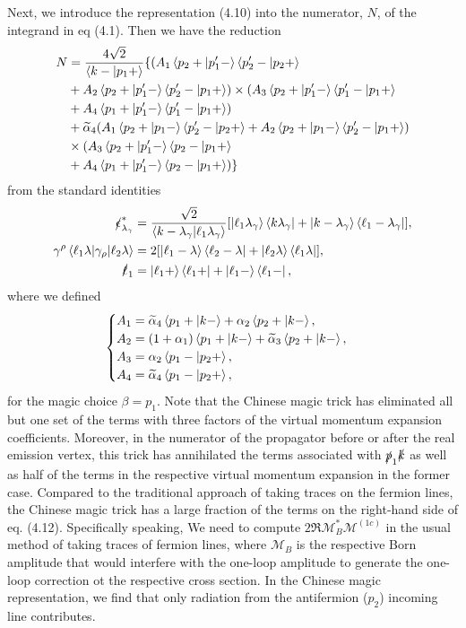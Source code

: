 Next, we introduce the representation (4.10) into the numerator, $N$, of the integrand in eq (4.1). Then we have the reduction
\begin{align}
N&=\frac{4\sqrt{2}}{\braket{k-|p_1+}}\{ (A_1\braket{p_2+|p'_1-}\braket{p'_2-|p_2+}\nonumber\\
& +A_2\braket{p_2+|p'_1-}\braket{p'_2-|p_1+} )\times(A_3\braket{p_2+|p'_1-}\braket{p'_1-|p_1+}\nonumber\\
& +A_4\braket{p_1+|p'_1-}\braket{p'_1-|p_1+} ) \nonumber\\
&+\widetilde{\alpha}_4 (A_1\braket{p_2+|p_1-}\braket{p'_2-|p_2+} +A_2\braket{p_2+|p_1-}\braket{p'_2-|p_1+} )
\nonumber\\
&\times(A_3\braket{p_2+|p'_1-}\braket{p_2-|p_1+}\nonumber\\
& +A_4\braket{p_1+|p'_1-}\braket{p_2-|p_1+} ) \}
\end{align}
from the standard identities
\begin{align}
\slashed \epsilon_{\lambda_\gamma}^\ast&=\frac{\sqrt{2}}{\braket{k-\lambda_\gamma|\ell_1\lambda_\gamma}}[\ket{\ell_1\lambda_\gamma}\bra{k\lambda_\gamma}+\ket{k-\lambda_\gamma}\bra{\ell_1-\lambda_\gamma}],\nonumber\\
\gamma^\rho\braket{\ell_1\lambda|\gamma_\rho|\ell_2\lambda}&=2[\ket{\ell_1-\lambda}\bra{\ell_2-\lambda}+\ket{\ell_2\lambda}\bra{\ell_1\lambda}],\nonumber\\
\slashed\ell_1&=\ket{\ell_1+}\bra{\ell_1+}+\ket{\ell_1-}\bra{\ell_1-},
\end{align}
where we defined
\begin{equation}
\begin{cases}
A_1=\widetilde{\alpha}_4\braket{p_1+|k-}+\alpha_2\braket{p_2+|k-},
\\
A_2=(1+\alpha_1)\braket{p_1+|k-}+\widetilde{\alpha}_3\braket{p_2+|k-},\\
A_3=\alpha_2\braket{p_1-|p_2+},\\
A_4=\widetilde{\alpha}_4\braket{p_1-|p_2+},
\end{cases}
\end{equation}
for the magic choice $\beta=p_1$. Note that the Chinese magic trick has eliminated all but one set of the terms with three factors of the virtual momentum expansion coefficients. Moreover, in the numerator of the propagator before or after the real emission vertex, this trick has annihilated the terms associated with $\slashed p_1\slashed k$ as well as half of the terms in the respective virtual momentum expansion in the former case. Compared to the traditional approach of taking traces on the fermion lines, the Chinese magic trick has a large fraction of the terms on the right-hand side of eq. (4.12). Specifically speaking, We need to compute $2\Re\mathcal{M}_B^\ast\mathcal{M}^{(1c)}$ in the usual method of taking traces of fermion lines, where $\mathcal{M}_B$ is the respective Born amplitude that would interfere with the one-loop amplitude to generate the one-loop correction ot the respective cross section. In the Chinese magic representation, we find that only radiation from the antifermion ($p_2$) incoming line contributes.  
